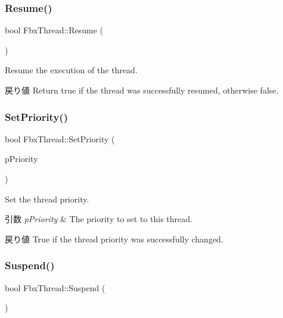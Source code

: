 \subsubsection{\texorpdfstring{Resume()}{Resume()}}
{\footnotesize\ttfamily bool Fbx\+Thread\+::\+Resume (\begin{DoxyParamCaption}{ }\end{DoxyParamCaption})}

Resume the execution of the thread. \begin{DoxyReturn}{戻り値}
Return true if the thread was successfully resumed, otherwise false. 
\end{DoxyReturn}
\mbox{\label{class_fbx_thread_a3aad216865d1009cd14bedfcd31bd79e}} 
\subsubsection{\texorpdfstring{Set\+Priority()}{SetPriority()}}
{\footnotesize\ttfamily bool Fbx\+Thread\+::\+Set\+Priority (\begin{DoxyParamCaption}\item[{\hyperlink{class_fbx_thread_a1b7d46235dd8589e03f7a29777f083f2}{E\+Priority}}]{p\+Priority }\end{DoxyParamCaption})}

Set the thread priority. 
\begin{DoxyParams}{引数}
{\em p\+Priority} & The priority to set to this thread. \\
\hline
\end{DoxyParams}
\begin{DoxyReturn}{戻り値}
True if the thread priority was successfully changed. 
\end{DoxyReturn}
\mbox{\label{class_fbx_thread_a41702b06399443c91e60c70be333d2a5}} 
\subsubsection{\texorpdfstring{Suspend()}{Suspend()}}
{\footnotesize\ttfamily bool Fbx\+Thread\+::\+Suspend (\begin{DoxyParamCaption}{ }\end{DoxyParamCaption})}

